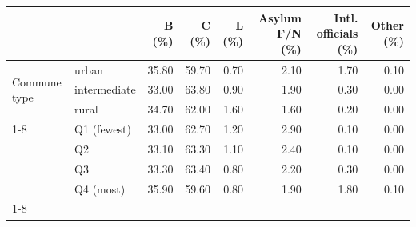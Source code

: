 \begin{tabular}{llrrrrrr}
\toprule
 &  & B (\%) & C (\%) & L (\%) & Asylum F/N (\%) & Intl. officials (\%) & Other (\%) \\
\midrule
\multirow[t]{3}{*}{Commune type} & urban & 35.80 & 59.70 & 0.70 & 2.10 & 1.70 & 0.10 \\
 & intermediate & 33.00 & 63.80 & 0.90 & 1.90 & 0.30 & 0.00 \\
 & rural & 34.70 & 62.00 & 1.60 & 1.60 & 0.20 & 0.00 \\
\cline{1-8}
\multirow[t]{4}{*}{Foreign-share quartile} & Q1 (fewest) & 33.00 & 62.70 & 1.20 & 2.90 & 0.10 & 0.00 \\
 & Q2 & 33.10 & 63.30 & 1.10 & 2.40 & 0.10 & 0.00 \\
 & Q3 & 33.30 & 63.40 & 0.80 & 2.20 & 0.30 & 0.00 \\
 & Q4 (most) & 35.90 & 59.60 & 0.80 & 1.90 & 1.80 & 0.10 \\
\cline{1-8}
\bottomrule
\end{tabular}
